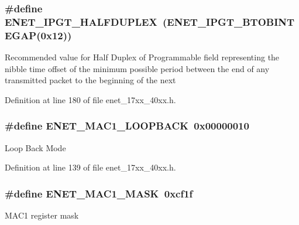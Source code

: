 \subsubsection[{\texorpdfstring{E\+N\+E\+T\+\_\+\+I\+P\+G\+T\+\_\+\+H\+A\+L\+F\+D\+U\+P\+L\+EX}{ENET_IPGT_HALFDUPLEX}}]{\setlength{\rightskip}{0pt plus 5cm}\#define E\+N\+E\+T\+\_\+\+I\+P\+G\+T\+\_\+\+H\+A\+L\+F\+D\+U\+P\+L\+EX~({\bf E\+N\+E\+T\+\_\+\+I\+P\+G\+T\+\_\+\+B\+T\+O\+B\+I\+N\+T\+E\+G\+AP}(0x12))}\hypertarget{group__ENET__17XX__40XX_ga4c98e396a39809243d38a68b27eeec02}{}\label{group__ENET__17XX__40XX_ga4c98e396a39809243d38a68b27eeec02}
Recommended value for Half Duplex of Programmable field representing the nibble time offset of the minimum possible period between the end of any transmitted packet to the beginning of the next 

Definition at line 180 of file enet\+\_\+17xx\+\_\+40xx.\+h.

\subsubsection[{\texorpdfstring{E\+N\+E\+T\+\_\+\+M\+A\+C1\+\_\+\+L\+O\+O\+P\+B\+A\+CK}{ENET_MAC1_LOOPBACK}}]{\setlength{\rightskip}{0pt plus 5cm}\#define E\+N\+E\+T\+\_\+\+M\+A\+C1\+\_\+\+L\+O\+O\+P\+B\+A\+CK~0x00000010}\hypertarget{group__ENET__17XX__40XX_ga5d10c874131056c389ecb1357be5e7a2}{}\label{group__ENET__17XX__40XX_ga5d10c874131056c389ecb1357be5e7a2}
Loop Back Mode 

Definition at line 139 of file enet\+\_\+17xx\+\_\+40xx.\+h.

\subsubsection[{\texorpdfstring{E\+N\+E\+T\+\_\+\+M\+A\+C1\+\_\+\+M\+A\+SK}{ENET_MAC1_MASK}}]{\setlength{\rightskip}{0pt plus 5cm}\#define E\+N\+E\+T\+\_\+\+M\+A\+C1\+\_\+\+M\+A\+SK~0xcf1f}\hypertarget{group__ENET__17XX__40XX_gadc9dc4a912f946aef0f397e01c745e23}{}\label{group__ENET__17XX__40XX_gadc9dc4a912f946aef0f397e01c745e23}
M\+A\+C1 register mask 

